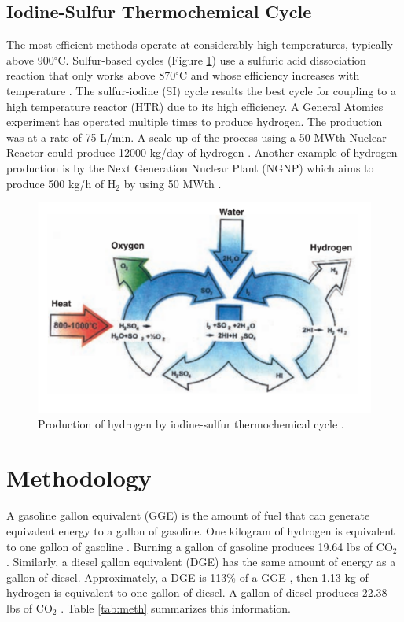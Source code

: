 \documentclass{anstrans}
\begin{document}
\subsection{Iodine-Sulfur Thermochemical Cycle}

The most efficient methods operate at considerably high temperatures, typically above 900$^{\circ}$C. Sulfur-based cycles (Figure \ref{fig:isulfur}) use a sulfuric acid dissociation reaction that only works above 870$^{\circ}$C and whose efficiency increases with temperature \cite{cea_gas-cooled_2006}. The sulfur-iodine (SI) cycle results the best cycle for coupling to a high temperature reactor (HTR) due to its high efficiency. A General Atomics experiment has operated multiple times to produce hydrogen. The production was at a rate of 75 L/min. A scale-up of the process using a 50 MWth Nuclear Reactor could produce 12000 kg/day of hydrogen \cite{benjamin_russ_sulfur_2009}.
Another example of hydrogen production is by the Next Generation Nuclear Plant (NGNP) \cite{macdonald_ngnp_2003} which aims to produce 500 kg/h of H$_2$ by using 50 MWth \cite{cea_gas-cooled_2006}.

\begin{figure}[H]
	\centering
	\includegraphics[width=0.9\linewidth]{figures/iodine-sulfur.png}
	\hfill
	\caption{Production of hydrogen by iodine-sulfur thermochemical cycle \cite{cea_gas-cooled_2006}.}
	\label{fig:isulfur}
\end{figure}

\section{Methodology}
\label{method}

A gasoline gallon equivalent (GGE) is the amount of fuel that can generate equivalent energy to a gallon of gasoline. One kilogram of hydrogen is equivalent to one gallon of gasoline \cite{noauthor_hydrogen_nodate}. Burning a gallon of gasoline produces 19.64 lbs of CO$_2$ \cite{noauthor_how_2014}. 
Similarly, a diesel gallon equivalent (DGE) has the same amount of energy as a gallon of diesel. Approximately, a DGE is 113\% of a GGE \cite{noauthor_fuel_2014}, then 1.13 kg of hydrogen is equivalent to one gallon of diesel.
A gallon of diesel produces 22.38 lbs of CO$_2$ \cite{noauthor_how_2014}. 
Table \ref{tab:meth} summarizes this information.
\end{document}
